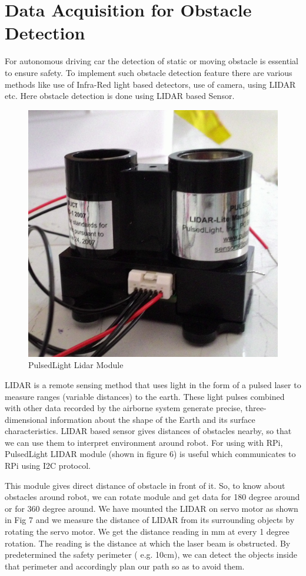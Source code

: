\documentclass[conference]{IEEEtran}
\begin{document}
\section{Data Acquisition for Obstacle Detection}
For autonomous driving car the detection of static or moving obstacle is essential to ensure safety. 
To implement such obstacle detection feature there are various methods like use of Infra-Red light based detectors, use of camera, using LIDAR etc. 
Here obstacle detection is done using LIDAR based Sensor.\cite{paper5}

\begin{figure}[H]
	\centering
	\includegraphics[width=0.4\linewidth]{lidar}
	\caption{PulsedLight Lidar Module}
	\label{fig:lidar}
\end{figure}

LIDAR is a remote sensing method that uses light in the form of a pulsed laser to measure ranges (variable distances) to the earth. These light pulses combined with other data recorded by the airborne system generate precise, three-dimensional information about the shape of the Earth and its surface characteristics. LIDAR based sensor gives distances of obstacles nearby, so that we can use them to interpret environment around robot.\cite{paper3} For using with RPi, PulsedLight LIDAR module (shown in figure 6) is useful which communicates to RPi using I2C protocol.  

This module gives direct distance of obstacle in front of it. So, to know about obstacles around robot, we can rotate module and get data for 180 degree around or for 360 degree around. We have mounted the LIDAR on servo motor as shown in Fig 7 and we measure the distance of LIDAR from its surrounding objects by rotating the servo motor. We get the distance reading in mm at every 1 degree rotation. The reading is the distance at which the laser beam is obstructed.  By predetermined the safety perimeter ( e.g. 10cm), we can detect the objects inside that perimeter and accordingly plan our path so as to avoid them. 
\end{document}
